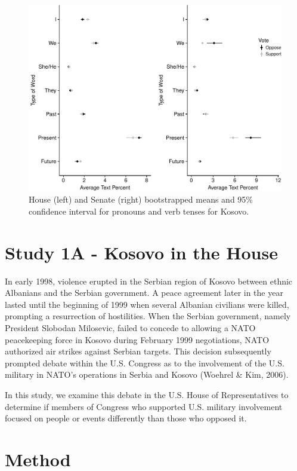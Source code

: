\documentclass[english,man]{apa6}
\theoremstyle{definition}
\theoremstyle{definition}
\theoremstyle{definition}
\theoremstyle{remark}
\begin{document}
\begin{figure}
\centering
\includegraphics{Language_of_War_Markdown_files/figure-latex/Kpic-1.pdf}
\caption{\label{fig:Kpic}House (left) and Senate (right) bootstrapped means
and 95\% confidence interval for pronouns and verb tenses for Kosovo.}
\end{figure}

\section{Study 1A - Kosovo in the
House}\label{study-1a---kosovo-in-the-house}

In early 1998, violence erupted in the Serbian region of Kosovo between
ethnic Albanians and the Serbian government. A peace agreement later in
the year lasted until the beginning of 1999 when several Albanian
civilians were killed, prompting a resurrection of hostilities. When the
Serbian government, namely President Slobodan Milosevic, failed to
concede to allowing a NATO peacekeeping force in Kosovo during February
1999 negotiations, NATO authorized air strikes against Serbian targets.
This decision subsequently prompted debate within the U.S. Congress as
to the involvement of the U.S. military in NATO's operations in Serbia
and Kosovo (Woehrel \& Kim, 2006).

In this study, we examine this debate in the U.S. House of
Representatives to determine if members of Congress who supported U.S.
military involvement focused on people or events differently than those
who opposed it.

\section{Method}\label{method-1}
\end{document}
